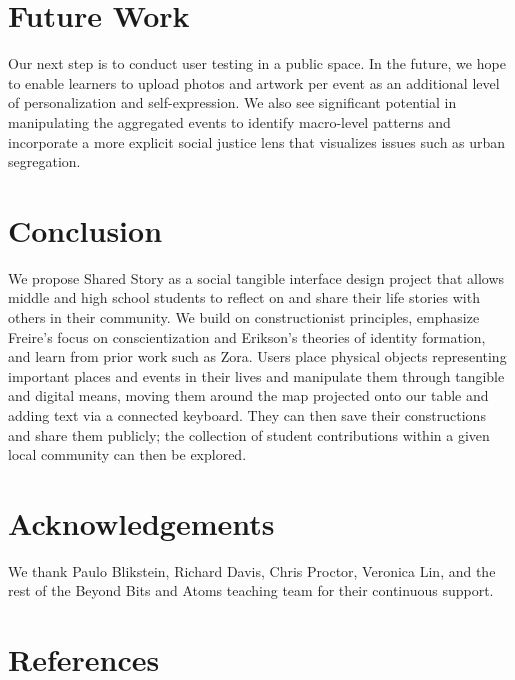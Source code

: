 \documentclass{sigchi-ext}
\begin{document}
\section{Future Work}
Our next step is to conduct user testing in a public space. In the future, we hope to enable learners to upload photos and artwork per event as an additional level of personalization and self-expression. We also see significant potential in manipulating the aggregated events to identify macro-level patterns and incorporate a more explicit social justice lens that visualizes issues such as urban segregation.

\section{Conclusion}
We propose Shared Story as a social tangible interface design project that allows middle and high school students to reflect on and share their life stories with others in their community. We build on constructionist principles, emphasize Freire's focus on conscientization and Erikson's theories of identity formation, and learn from prior work such as Zora. Users place physical objects representing important places and events in their lives and manipulate them through tangible and digital means, moving them around the map projected onto our table and adding text via a connected keyboard. They can then save their constructions and share them publicly; the collection of student contributions within a given local community can then be explored.

\section{Acknowledgements}
We thank Paulo Blikstein, Richard Davis, Chris Proctor, Veronica Lin, and the rest of the Beyond Bits and Atoms teaching team for their continuous support.


\section{References}
\vspace{4mm}
\end{document}
